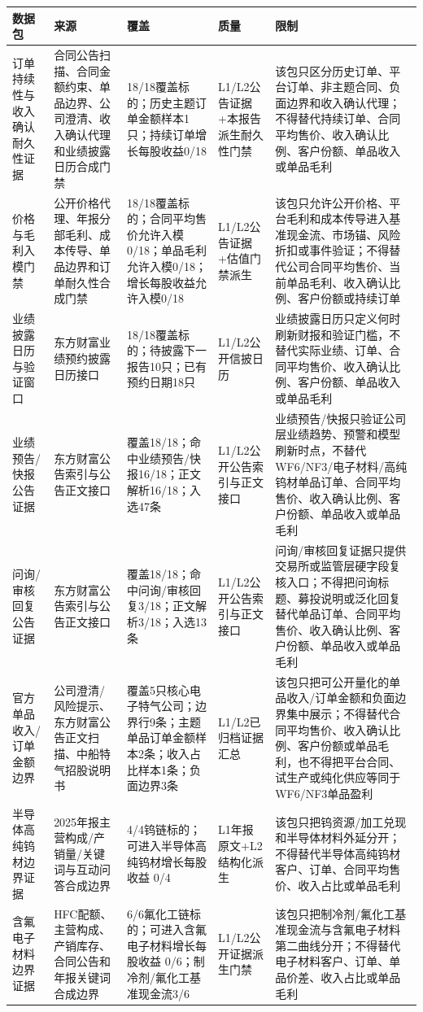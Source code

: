 \begin{exhibitbox}[结构化数据源健康（5）]
\scriptsize
\begin{tabularx}{\exhibitboxwidth}{L{2.1cm} L{2.4cm} L{2.4cm} L{1.5cm} X}
\toprule
\textbf{数据包} & \textbf{来源} & \textbf{覆盖} & \textbf{质量} & \textbf{限制} \\
\midrule
订单持续性与收入确认耐久性证据 & 合同公告扫描、合同金额约束、单品边界、公司澄清、收入确认代理和业绩披露日历合成门禁 & 18/18覆盖标的；历史主题订单金额样本1只；持续订单增长每股收益0/18 & L1/L2公告证据+本报告派生耐久性门禁 & 该包只区分历史订单、平台订单、非主题合同、负面边界和收入确认代理；不得替代持续订单、合同平均售价、收入确认比例、客户份额、单品收入或单品毛利 \\
价格与毛利入模门禁 & 公开价格代理、年报分部毛利、成本传导、单品边界和订单耐久性合成门禁 & 18/18覆盖标的；合同平均售价允许入模0/18；单品毛利允许入模0/18；增长每股收益允许入模0/18 & L1/L2公告证据+估值门禁派生 & 该包只允许公开价格、平台毛利和成本传导进入基准现金流、市场锚、风险折扣或事件验证；不得替代公司合同平均售价、当前单品毛利、收入确认比例、客户份额或持续订单 \\
业绩披露日历与验证窗口 & 东方财富业绩预约披露日历接口 & 18/18覆盖标的；待披露下一报告10只；已有预约日期18只 & L1/L2公开信披日历 & 业绩披露日历只定义何时刷新财报和验证门槛，不替代实际业绩、订单、合同平均售价、收入确认比例、客户份额、单品收入或单品毛利 \\
业绩预告/快报公告证据 & 东方财富公告索引与公告正文接口 & 覆盖18/18；命中业绩预告/快报16/18；正文解析16/18；入选47条 & L1/L2公开公告索引与正文接口 & 业绩预告/快报只验证公司层业绩趋势、预警和模型刷新时点，不替代WF6/NF3/电子材料/高纯钨材单品订单、合同平均售价、收入确认比例、客户份额、单品收入或单品毛利 \\
问询/审核回复公告证据 & 东方财富公告索引与公告正文接口 & 覆盖18/18；命中问询/审核回复3/18；正文解析3/18；入选13条 & L1/L2公开公告索引与正文接口 & 问询/审核回复证据只提供交易所或监管层硬字段复核入口；不得把问询标题、募投说明或泛化回复替代单品订单、合同平均售价、收入确认比例、客户份额、单品收入或单品毛利 \\
官方单品收入/订单金额边界 & 公司澄清/风险提示、东方财富公告正文扫描、中船特气招股说明书 & 覆盖5只核心电子特气公司；边界行9条；主题单品订单金额样本2条；收入占比样本1条；负面边界3条 & L1/L2已归档证据汇总 & 该包只把可公开量化的单品收入/订单金额和负面边界集中展示；不得替代合同平均售价、收入确认比例、客户份额或单品毛利，也不得把平台合同、试生产或纯化供应等同于WF6/NF3单品盈利 \\
半导体高纯钨材边界证据 & 2025年报主营构成/产销量/关键词与互动问答合成边界 & 4/4钨链标的；可进入半导体高纯钨材增长每股收益 0/4 & L1年报原文+L2结构化派生 & 该包只把钨资源/加工兑现和半导体材料外延分开；不得替代半导体高纯钨材客户、订单、合同平均售价、收入占比或单品毛利 \\
含氟电子材料边界证据 & HFC配额、主营构成、产销库存、合同公告和年报关键词合成边界 & 6/6氟化工链标的；可进入含氟电子材料增长每股收益 0/6；制冷剂/氟化工基准现金流3/6 & L1/L2公开证据派生门禁 & 该包只把制冷剂/氟化工基准现金流与含氟电子材料第二曲线分开；不得替代电子材料客户、订单、单品价差、收入占比或单品毛利 \\
\bottomrule
\end{tabularx}
\end{exhibitbox}


